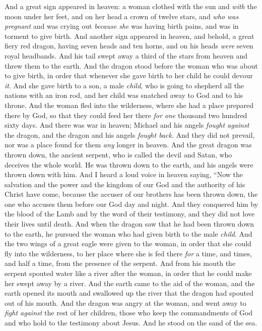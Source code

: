 \begin{biblechapter} %
 And a great sign appeared in heaven: a woman clothed with the sun and \textit{with} the moon under her feet, and on her head a crown of twelve stars,
\verse and \textit{who was pregnant} and was crying out \textit{because she} was having birth pains, and was in torment to give birth.
\verse And another sign appeared in heaven, and behold, a great fiery red dragon, having seven heads and ten horns, and on his heads \textit{were} seven royal headbands.
\verse And his tail swept away a third of the stars from heaven and threw them to the earth. And the dragon stood before the woman who was about to give birth, in order that whenever she gave birth to her child he could devour \textit{it}.
\verse And she gave birth to a son, a male \textit{child}, who is going to shepherd all the nations with an iron rod, and her child was snatched away to God and to his throne.
\verse And the woman fled into the wilderness, where she had a place prepared there by God, so that they could feed her there \textit{for one} thousand two hundred sixty days.
 And there was war in heaven; Michael and his angels \textit{fought against} the dragon, and the dragon and his angels \textit{fought back}.
\verse And they did not prevail, nor was a place found for them \textit{any} longer in heaven.
\verse And the great dragon was thrown down, the ancient serpent, who is called the devil and Satan, who deceives the whole world. He was thrown down to the earth, and his angels were thrown down with him.
\verse And I heard a loud voice in heaven saying,
\verse “Now the salvation and the power 
and the kingdom of our God 
and the authority of his Christ have come, 
because the accuser of our brothers has been thrown down, 
the one who accuses them before our God day and night.
\verse And they conquered him by the blood of the Lamb 
and by the word of their testimony, 
and they did not love their lives until death.
\verse And when the dragon saw that he had been thrown down to the earth, he pursued the woman who had given birth to the male \textit{child}.
\verse And the two wings of a great eagle were given to the woman, in order that she could fly into the wilderness, to her place where she is fed there \textit{for} a time, and times, and half a time, from the presence of the serpent.
\verse And from his mouth the serpent spouted water like a river after the woman, in order that he could make her swept away by a river.
\verse And the earth came to the aid of the woman, and the earth opened its mouth and swallowed up the river that the dragon had spouted out of his mouth.
\verse And the dragon was angry at the woman, and went away to \textit{fight against} the rest of her children, those who keep the commandments of God and who hold to the testimony about Jesus.
\verse And he stood on the sand of the sea.
\end{biblechapter}

